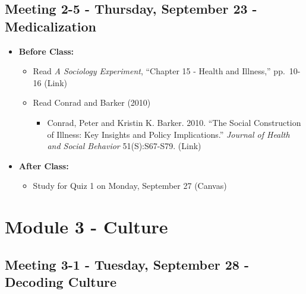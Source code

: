 \documentclass[
]{book}
\providecommand{\tightlist}{%
  \setlength{\itemsep}{0pt}\setlength{\parskip}{0pt}}
\begin{document}
\hypertarget{meeting-2-5---thursday-september-23---medicalization}{%
\subsection*{Meeting 2-5 - Thursday, September 23 - Medicalization}\label{meeting-2-5---thursday-september-23---medicalization}}

\begin{itemize}
\tightlist
\item
  \textbf{Before Class:}

  \begin{itemize}
  \tightlist
  \item
    Read \emph{A Sociology Experiment}, ``Chapter 15 - Health and Illness,'' pp.~10-16 (Link)
  \item
    Read Conrad and Barker (2010)

    \begin{itemize}
    \tightlist
    \item
      Conrad, Peter and Kristin K. Barker. 2010. ``The Social Construction of Illness: Key Insights and Policy Implications.'' \emph{Journal of Health and Social Behavior} 51(S):S67-S79. (Link)
    \end{itemize}
  \end{itemize}
\item
  \textbf{After Class:}

  \begin{itemize}
  \tightlist
  \item
    Study for Quiz 1 on Monday, September 27 (Canvas)
  \end{itemize}
\end{itemize}

\newpage

\hypertarget{module-3---culture}{%
\section{Module 3 - Culture}\label{module-3---culture}}

\hypertarget{meeting-3-1---tuesday-september-28---decoding-culture}{%
\subsection*{Meeting 3-1 - Tuesday, September 28 - Decoding Culture}\label{meeting-3-1---tuesday-september-28---decoding-culture}}
\end{document}
